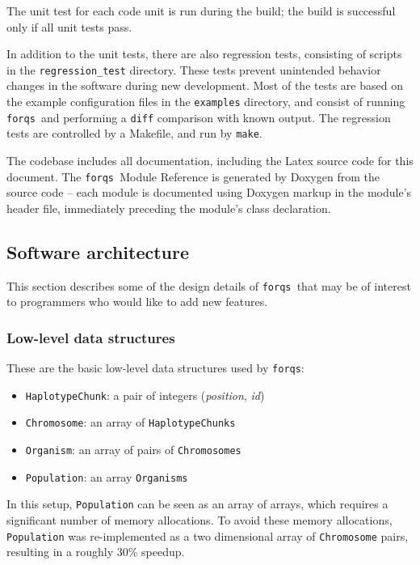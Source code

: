 \documentclass{article}
\newcommand{\forqs}[0]{\texttt{forqs }}
\begin{document}
The unit test for each code unit is run during the build; the build is
successful only if all unit tests pass.

In addition to the unit tests, there are also regression tests, consisting of
scripts in the \texttt{regression\_test} directory.  These tests prevent
unintended behavior changes in the software during new development.  Most of
the tests are based on the example configuration files in the
\texttt{examples} directory, and consist of running \forqs and performing a
\texttt{diff} comparison with known output.  The regression tests are
controlled by a Makefile, and run by \texttt{make}.

The codebase includes all documentation, including the Latex source code for 
this document.  The \forqs Module Reference is generated by Doxygen from
the source code -- each module is documented using Doxygen markup in the
module's header file, immediately preceding the module's class declaration.


\subsection{Software architecture}

This section describes some of the design details of \forqs that may be of
interest to programmers who would like to add new features.

\subsubsection{Low-level data structures}

These are the basic low-level data structures used by \texttt{forqs}:
\begin{itemize}
    \item \texttt{HaplotypeChunk}: a pair of integers (\emph{position}, \emph{id})
    \item \texttt{Chromosome}: an array of \texttt{HaplotypeChunks}
    \item \texttt{Organism}: an array of pairs of \texttt{Chromosomes}
    \item \texttt{Population}: an array \texttt{Organisms}
\end{itemize}

In this setup, \texttt{Population} can be seen as an array of arrays, which
requires a significant number of memory allocations.  To avoid these memory
allocations, \texttt{Population} was re-implemented as a two dimensional
array of \texttt{Chromosome} pairs, resulting in a roughly 30\% speedup.
\end{document}
